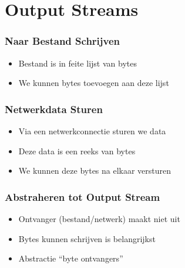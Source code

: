 \section{Output Streams}

\frame{\tableofcontents[currentsection]}

\begin{frame}
  \frametitle{Naar Bestand Schrijven}
  \begin{itemize}
    \item Bestand is in feite lijst van bytes
    \item We kunnen bytes toevoegen aan deze lijst
  \end{itemize}
\end{frame}

\begin{frame}
  \frametitle{Netwerkdata Sturen}
  \begin{itemize}
    \item Via een netwerkconnectie sturen we data
    \item Deze data is een reeks van bytes
    \item We kunnen deze bytes na elkaar versturen
  \end{itemize}
\end{frame}

\begin{frame}
  \frametitle{Abstraheren tot Output Stream}
  \begin{itemize}
    \item Ontvanger (bestand/netwerk) maakt niet uit
    \item Bytes kunnen schrijven is belangrijkst
    \item Abstractie ``byte ontvangers''
  \end{itemize}
  \begin{center}
  \end{center}
\end{frame}

